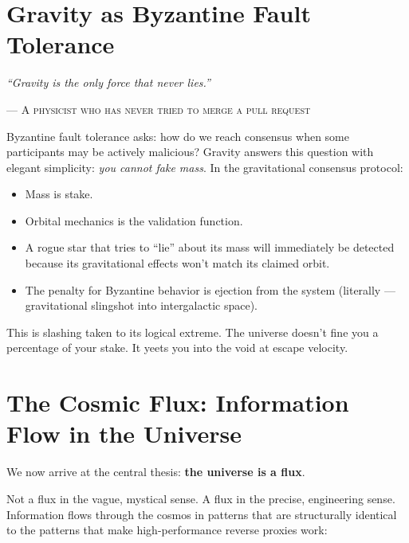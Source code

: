 \documentclass[12pt,a4paper]{article}
\begin{document}
\section{Gravity as Byzantine Fault Tolerance}

\epigraph{\textit{``Gravity is the only force that never lies.''}}%
{\textsc{--- A physicist who has never tried to merge a pull request}}

Byzantine fault tolerance asks: how do we reach consensus when some
participants may be actively malicious? Gravity answers this question with
elegant simplicity: \emph{you cannot fake mass}. In the gravitational
consensus protocol:

\begin{itemize}
    \item Mass is stake.
    \item Orbital mechanics is the validation function.
    \item A rogue star that tries to ``lie'' about its mass will immediately
    be detected because its gravitational effects won't match its claimed orbit.
    \item The penalty for Byzantine behavior is ejection from the system
    (literally --- gravitational slingshot into intergalactic space).
\end{itemize}

This is slashing taken to its logical extreme. The universe doesn't fine you
a percentage of your stake. It yeets you into the void at escape velocity.

\section{The Cosmic Flux: Information Flow in the Universe}

We now arrive at the central thesis: \textbf{the universe is a flux}.

Not a flux in the vague, mystical sense. A flux in the precise, engineering
sense. Information flows through the cosmos in patterns that are structurally
identical to the patterns that make high-performance reverse proxies work:
\end{document}
